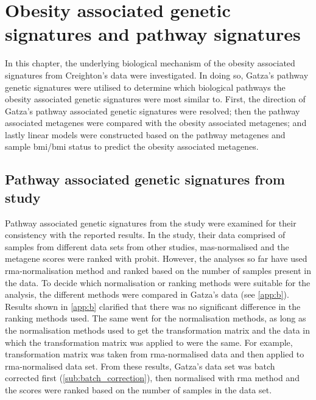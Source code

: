 \chapter{Obesity associated genetic signatures and pathway signatures}
\label{cha:obesity_associated_genetic_signature_and_pathway_signatures}

In this chapter, the underlying biological mechanism of the obesity associated signatures from Creighton's data were investigated.
In doing so, Gatza's pathway genetic signatures were utilised to determine which biological pathways the obesity associated genetic signatures were most similar to.
First, the direction of Gatza's pathway associated genetic signatures were resolved; then the pathway associated metagenes were compared with the obesity associated metagenes; and lastly linear models were constructed based on the pathway metagenes and sample \gls{bmi}/\gls{bmi} status to predict the obesity associated metagenes.

\section{Pathway associated genetic signatures from \citet{Gatza2010a} study}
\label{sec:pathway_associated_genetic_signatures_from_gatza2010a_study}

Pathway associated genetic signatures from the \citet{Gatza2010a} study were examined for their consistency with the reported results.
In the \citet{Gatza2010a} study, their data comprised of samples from different data sets from other studies, \gls{mas}-normalised and the metagene scores were ranked with probit.
However, the analyses so far have used \gls{rma}-normalisation method and ranked based on the number of samples present in the data.
To decide which normalisation or ranking methods were suitable for the analysis, the different methods were compared in Gatza's data (see \cref{app:b}).
Results shown in \cref{app:b} clarified that there was no significant difference in the ranking methods used.
The same went for the normalisation methods, as long as the normalisation methods used to get the transformation matrix and the data in which the transformation matrix was applied to were the same.
For example, transformation matrix was taken from \gls{rma}-normalised data and then applied to \gls{rma}-normalised data set.
From these results, Gatza's data set was batch corrected first (\cref{sub:batch_correction}), then normalised with \gls{rma} method and the scores were ranked based on the number of samples in the data set.

